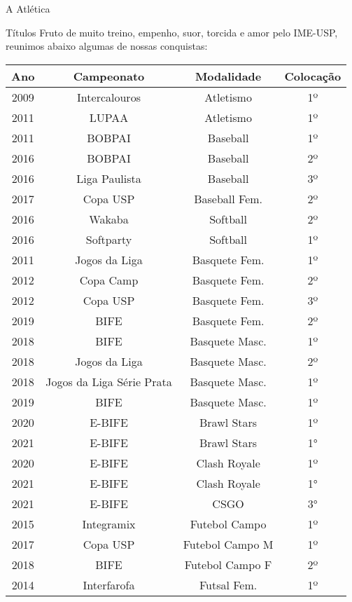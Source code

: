 \begin{secao}{A Atlética}
\begin{subsecao}{Títulos}
Fruto de muito treino, empenho, suor, torcida e amor pelo IME-USP, reunimos
abaixo algumas de nossas conquistas:

\begin{center}
  \begin{tabular}{c|c|c|c}
    Ano & Campeonato & Modalidade & Colocação\\
    \hline
    2009 & Intercalouros  & Atletismo       & 1º\\
    2011 & LUPAA          & Atletismo       & 1º\\
    2011 & BOBPAI         & Baseball        & 1º\\
    2016 & BOBPAI         & Baseball        & 2º\\
    2016 & Liga Paulista  & Baseball        & 3º\\
    2017 & Copa USP       & Baseball Fem.   & 2º\\
    2016 & Wakaba         & Softball        & 2º\\
    2016 & Softparty      & Softball        & 1º\\
    2011 & Jogos da Liga  & Basquete Fem.   & 1º\\
    2012 & Copa Camp      & Basquete Fem.   & 2º\\
    2012 & Copa USP       & Basquete Fem.   & 3º\\
    2019 & BIFE           & Basquete Fem.   & 2º\\
    2018 & BIFE           & Basquete Masc.  & 1º\\
    2018 & Jogos da Liga  & Basquete Masc.  & 2º\\
    2018 & Jogos da Liga Série Prata  & Basquete Masc.  & 1º\\
    2019 & BIFE           & Basquete Masc.  & 1º\\
    2020 & E-BIFE         & Brawl Stars     & 1º\\
    2021 & E-BIFE         & Brawl Stars     & 1°\\
    2020 & E-BIFE         & Clash Royale    & 1º\\
    2021 & E-BIFE         & Clash Royale    & 1°\\
    2021 & E-BIFE         & CSGO            & 3°\\
    2015 & Integramix     & Futebol Campo   & 1º\\
    2017 & Copa USP       & Futebol Campo M & 1º\\
    2018 & BIFE           & Futebol Campo F & 2º\\
    2014 & Interfarofa    & Futsal Fem.     & 1º\\

\end{tabular}
\end{center}
\end{subsecao}
\end{secao}
